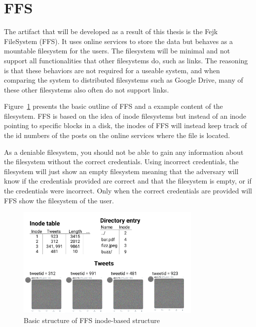 \section{FFS}
The artifact that will be developed as a result of this thesis is the Fejk FileSystem (FFS). It uses online services to store the data but behaves as a mountable filesystem for the users. The filesystem will be minimal and not support all functionalities that other filesystems do, such as links. The reasoning is that these behaviors are not required for a useable system, and when comparing the system to distributed filesystems such as Google Drive, many of these other filesystems also often do not support links.

Figure~\ref{fig:ffs_inode_diag} presents the basic outline of FFS and a example content of the filesystem. FFS is based on the idea of inode filesystems but instead of an inode pointing to specific blocks in a disk, the inodes of FFS will instead keep track of the id numbers of the posts on the online services where the file is located. 

As a deniable filesystem, you should not be able to gain any information about the filesystem without the correct credentials. Using incorrect credentials, the filesystem will just show an empty filesystem meaning that the adversary will know if the credentials provided are correct and that the filesystem is empty, or if the credentials were incorrect. Only when the correct credentials are provided will FFS show the filesystem of the user.

\begin{figure}[!ht]
	\begin{center}
	  \includegraphics[width=0.8\textwidth]{figures/ffs_inode_diagram.png}
	\end{center}
	\caption{Basic structure of FFS inode-based structure}
	\label{fig:ffs_inode_diag}
\end{figure}

